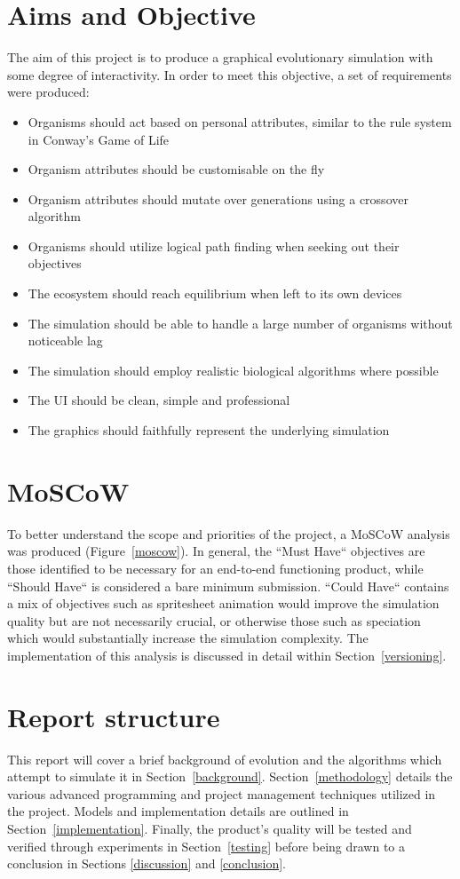 \documentclass[a4paper, oneside, 11pt]{report}
\begin{document}
\section{Aims and Objective}
The aim of this project is to produce a graphical evolutionary simulation with some degree of interactivity. In order to meet this objective, a set of requirements were produced:
\begin{itemize}\label{requirements}
	\item Organisms should act based on personal attributes, similar to the rule system in Conway's Game of Life
	\item Organism attributes should be customisable on the fly
	\item Organism attributes should mutate over generations using a crossover algorithm
	\item Organisms should utilize logical path finding when seeking out their objectives
	\item The ecosystem should reach equilibrium when left to its own devices
	\item The simulation should be able to handle a large number of organisms without noticeable lag
	\item The simulation should employ realistic biological algorithms where possible
	\item The UI should be clean, simple and professional
	\item The graphics should faithfully represent the underlying simulation
\end{itemize}

\section{MoSCoW}
To better understand the scope and priorities of the project, a MoSCoW analysis was produced (Figure~\ref{moscow}). In general, the ``Must Have`` objectives are those identified to be necessary for an end-to-end functioning product, while ``Should Have`` is considered a bare minimum submission. ``Could Have`` contains a mix of objectives such as spritesheet animation would improve the simulation quality but are not necessarily crucial, or otherwise those such as speciation which would substantially increase the simulation complexity. The implementation of this analysis is discussed in detail within Section~\ref{versioning}.

\section{Report structure}
This report will cover a brief background of evolution and the algorithms which attempt to simulate it in Section~\ref{background}. Section~\ref{methodology} details the various advanced programming and project management techniques utilized in the project. Models and implementation details are outlined in Section~\ref{implementation}. Finally, the product's quality will be tested and verified through experiments in Section~\ref{testing} before being drawn to a conclusion in Sections \ref{discussion} and \ref{conclusion}.
\end{document}
